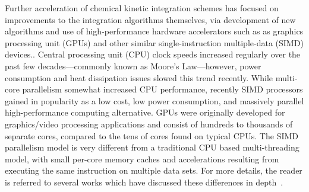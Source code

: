 \documentclass[preprint,12pt]{elsarticle}
\begin{document}
Further acceleration of chemical kinetic integration schemes has focused on improvements to the integration algorithms themselves, via development of new algorithms and use of high-performance hardware accelerators such as as graphics processing unit (GPUs) and other similar single-instruction multiple-data (SIMD) devices..
Central processing unit (CPU) clock speeds increased regularly over the past few decades---commonly known as Moore's Law---however, power consumption and heat dissipation issues slowed this trend recently.
While multi-core parallelism somewhat increased CPU performance, recently SIMD processors gained in popularity as a low cost, low power consumption, and massively parallel high-performance computing alternative.
GPUs were originally developed for graphics\slash video processing applications and consist of hundreds to thousands of separate cores, compared to the tens of cores found on typical CPUs.
The SIMD parallelism model is very different from a traditional CPU based multi-threading model, with small per-core memory caches and accelerations resulting from executing the same instruction on multiple data sets.
For more details, the reader is referred to several works which have discussed these differences in depth~\cite{Cruz:2011gc,Brodtkorb:2013hn,Niemeyer:2014hn}.
\end{document}
